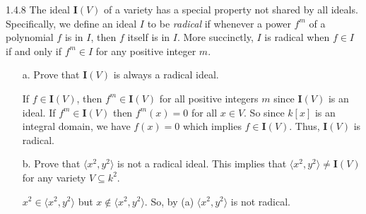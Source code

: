 \documentclass[12pt]{article}
\newcommand{\iv}{\mathbf{I}(V)}
\begin{document}
1.4.8
The ideal $\mathbf{I}(V)$ of a variety has a special property not shared by all ideals. Specifically, we define an ideal $I$ to be \textit{radical} if whenever a power $f^m$ of a polynomial $f$ is in $I$, then $f$ itself is in $I$. More succinctly, $I$ is radical when $f\in I$ if and only if $f^m\in I$ for any positive integer $m$.
\begin{enumerate}
    \item[a.] Prove that $\mathbf{I}(V)$ is always a radical ideal.
    \begin{mybox}
        If $f\in\iv$, then $f^m\in\iv$ for all positive
        integers $m$ since $\iv$ is an ideal. If
        $f^m\in\iv$ then $f^m(x)=0$ for all $x\in V$.
        So since $k[x]$ is an integral domain, we have $f(x)=0$
        which implies $f\in\iv$. Thus, $\iv$ is radical.
    \end{mybox}
    \item[b.] Prove that $\langle x^2,y^2 \rangle$ is not a radical ideal. This implies that $\langle x^2,y^2 \rangle \neq \mathbf{I}(V)$ for any variety $V\subseteq k^2$.
    \begin{mybox}
        $x^2 \in\langle x^2,y^2 \rangle$ but $x\notin \langle x^2,y^2 \rangle$.
        So, by (a) $\langle x^2,y^2 \rangle$ is not radical.
    \end{mybox}
\end{enumerate}
\end{document}
